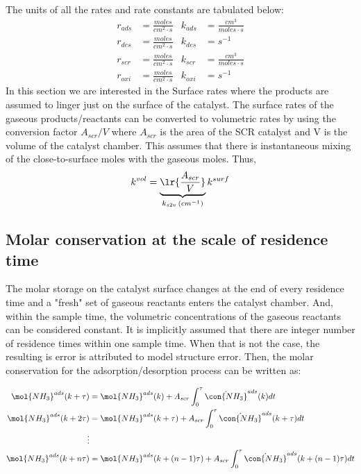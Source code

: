 The units of all the rates and rate constants are tabulated below:
\begin{align*}
    r_{ads} &= \frac{moles}{cm^2 \cdot s} &
    k_{ads} &= \frac{cm^3}{moles \cdot s} \\
    r_{des} &= \frac{moles}{cm^2 \cdot s} &
    k_{des} &= s^{-1} \\
    r_{scr} &= \frac{moles}{cm^2 \cdot s} &
    k_{scr} &= \frac{cm^3}{moles \cdot s} \\
    r_{oxi} &= \frac{moles}{cm^2 \cdot s} &
    k_{oxi} &= s^{-1}
\end{align*}
In this section we are interested in the Surface rates where the products are assumed to linger just on the
surface of the catalyst. The surface rates of the gaseous products/reactants can be converted to volumetric rates by
using the conversion factor $A_{scr}/V$ where $A_{scr}$ is the area of the SCR catalyst and V is the volume of the
catalyst chamber. This assumes that there is instantaneous mixing of the close-to-surface moles with the gaseous moles.
Thus,
\begin{align}
    k^{vol} = \underbrace{\lr{\frac{A_{scr}}{V}}}_{k_{s2v} \, (cm^{-1})} k^{surf}
\end{align}
\subsection{Molar conservation at the scale of residence time}

The molar storage on the catalyst surface changes at the end of every residence time and a "fresh" set of gaseous
reactants enters the catalyst chamber. And, within the sample time, the volumetric concentrations of the gaseous
reactants can be considered constant.  It is implicitly
assumed that there are integer number of residence times within one sample time. When that is not the case, the
resulting is error is attributed to model structure error. Then, the molar conservation for the adsorption/desorption
process can be written as:

\begin{align*}
    \mol{NH_3}^{ads} (k + \tau) &= \mol{NH_3}^{ads} (k) + A_{scr} \int_{0}^{\tau} \dot{\con{NH_3}}^{ads} (k) dt\\
    \mol{NH_3}^{ads} (k + 2\tau) &= \mol{NH_3}^{ads} (k + \tau) + A_{scr} \int_{0}^{\tau} \dot{\con{NH_3}}^{ads} (k + \tau) dt\\
    \vdots&\\
    \mol{NH_3}^{ads} (k + n\tau) &= \mol{NH_3}^{ads} (k + (n-1)\tau) + A_{scr} \int_{0}^{\tau} \dot{\con{NH_3}}^{ads} (k + (n-1)\tau) dt
\end{align*}

